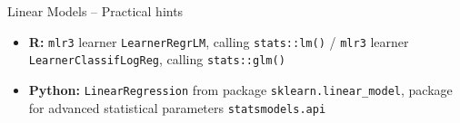 
\begin{frame}{Linear Models -- Practical hints}





\begin{itemize}
  \item \textbf{R:} \texttt{mlr3} learner \texttt{LearnerRegrLM}, calling 
  \texttt{stats::lm()} / \texttt{mlr3} learner \texttt{LearnerClassifLogReg}, 
  calling \texttt{stats::glm()}
  \item \textbf{Python:} \texttt{LinearRegression} from package 
  \texttt{sklearn.linear\_model}, package for advanced statistical parameters 
  \texttt{statsmodels.api} 
\end{itemize}

\end{frame}